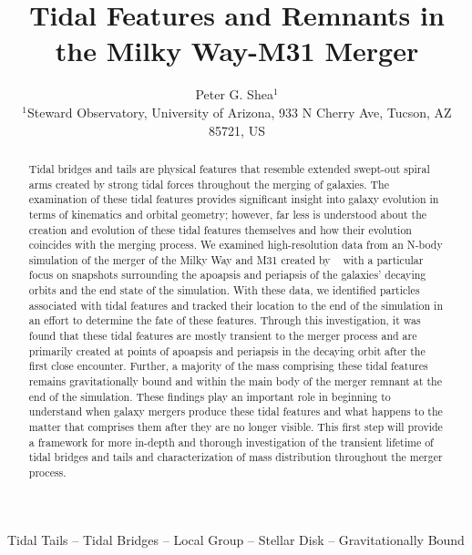 \documentclass[fleqn,usenatbib]{mnras}
\title{Tidal Features and Remnants in the Milky Way-M31 Merger}
\author[P. G. Shea]{
Peter G. Shea$^{1}$
\\
$^{1}$Steward Observatory, University of Arizona, 933 N Cherry Ave, Tucson, AZ 85721, US\\
}
\begin{document}
\label{firstpage}
\pagerange{\pageref{firstpage}--\pageref{lastpage}}
\maketitle

\begin{abstract}
Tidal bridges and tails are physical features that resemble extended swept-out spiral arms created by strong tidal forces throughout the merging of galaxies. The examination of these tidal features provides significant insight into galaxy evolution in terms of kinematics and orbital geometry; however, far less is understood about the creation and evolution of these tidal features themselves and how their evolution coincides with the merging process. We examined high-resolution data from an N-body simulation of the merger of the Milky Way and M31 created by ~\cite{van_der_Marel_Besla_2012} with a particular focus on snapshots surrounding the apoapsis and periapsis of the galaxies' decaying orbits and the end state of the simulation. With these data, we identified particles associated with tidal features and tracked their location to the end of the simulation in an effort to determine the fate of these features. Through this investigation, it was found that these tidal features are mostly transient to the merger process and are primarily created at points of apoapsis and periapsis in the decaying orbit after the first close encounter. Further, a majority of the mass comprising these tidal features remains gravitationally bound and within the main body of the merger remnant at the end of the simulation. These findings play an important role in beginning to understand when galaxy mergers produce these tidal features and what happens to the matter that comprises them after they are no longer visible. This first step will provide a framework for more in-depth and thorough investigation of the transient lifetime of tidal bridges and tails and characterization of mass distribution throughout the merger process.
\end{abstract}

\begin{keywords}
Tidal Tails -- Tidal Bridges -- Local Group -- Stellar Disk -- Gravitationally Bound
\end{keywords}

\end{document}
